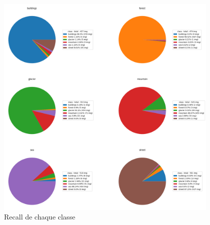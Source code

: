 \documentclass[12pt ,a4paper ]{article}
\begin{document}
\begin{figure}[h]
    \begin{center}
        \includegraphics[width=0.95\textwidth]{./img/pie_diagram.png}
    \end{center}
    \caption{Recall de chaque classe}
\end{figure}
\end{document}
